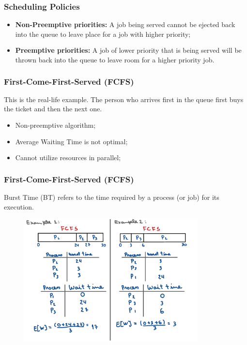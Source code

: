 \begin{frame}
    \frametitle{Scheduling Policies}
    \begin{itemize}

        \item \textbf{Non-Preemptive priorities:} A job being served cannot be ejected back 
        into the queue to leave place for a job with higher priority;

        \item \textbf{Preemptive priorities:} A job of lower priority that is being served will 
        be thrown back into the queue to leave room for a higher priority job.

    \end{itemize}
\end{frame}



\begin{frame}
    \frametitle{First-Come-First-Served (FCFS)}

    This is the real-life example. The person who arrives first in the queue first buys the ticket and then the next one. 
    \begin{itemize}

        \item Non-preemptive algorithm;

        \item Average Waiting Time is not optimal;

        \item Cannot utilize resources in parallel;

    \end{itemize}
\end{frame}



\begin{frame}
    \frametitle{First-Come-First-Served (FCFS)}

    Burst Time (BT) refers to the time required by a process (or job) for its execution. 
    \begin{figure}
        \centering
        \includegraphics[width=0.85\textwidth]{slides/figures/fcfs_example.pdf}
    \end{figure}
\end{frame}


